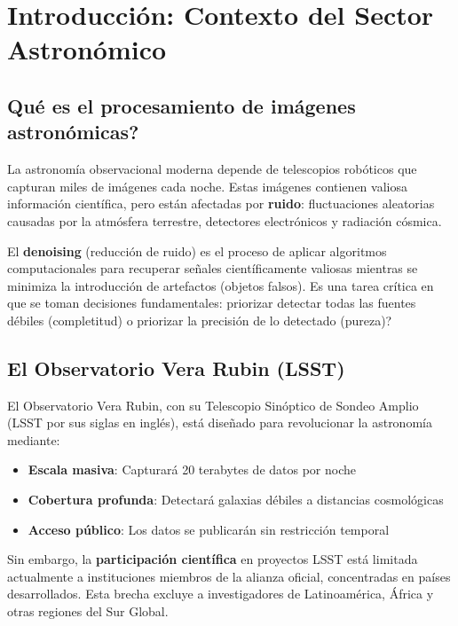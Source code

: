\section{Introducción: Contexto del Sector Astronómico}

\subsection{\textquestiondown Qué es el procesamiento de imágenes astronómicas?}

La astronomía observacional moderna depende de telescopios robóticos que capturan miles de imágenes cada noche. Estas imágenes contienen valiosa información científica, pero están afectadas por \textbf{ruido}: fluctuaciones aleatorias causadas por la atmósfera terrestre, detectores electrónicos y radiación cósmica.

El \textbf{denoising} (reducción de ruido) es el proceso de aplicar algoritmos computacionales para recuperar señales científicamente valiosas mientras se minimiza la introducción de artefactos (objetos falsos). Es una tarea crítica en que se toman decisiones fundamentales: \textquestiondown priorizar detectar todas las fuentes débiles (completitud) o priorizar la precisión de lo detectado (pureza)?

\subsection{El Observatorio Vera Rubin (LSST)}

El Observatorio Vera Rubin, con su Telescopio Sinóptico de Sondeo Amplio (LSST por sus siglas en inglés), está diseñado para revolucionar la astronomía mediante:

\begin{itemize}
    \item \textbf{Escala masiva}: Capturará 20 terabytes de datos por noche
    \item \textbf{Cobertura profunda}: Detectará galaxias débiles a distancias cosmológicas
    \item \textbf{Acceso público}: Los datos se publicarán sin restricción temporal
\end{itemize}

Sin embargo, la \textbf{participación científica} en proyectos LSST está limitada actualmente a instituciones miembros de la alianza oficial, concentradas en países desarrollados. Esta brecha excluye a investigadores de Latinoamérica, África y otras regiones del Sur Global.

